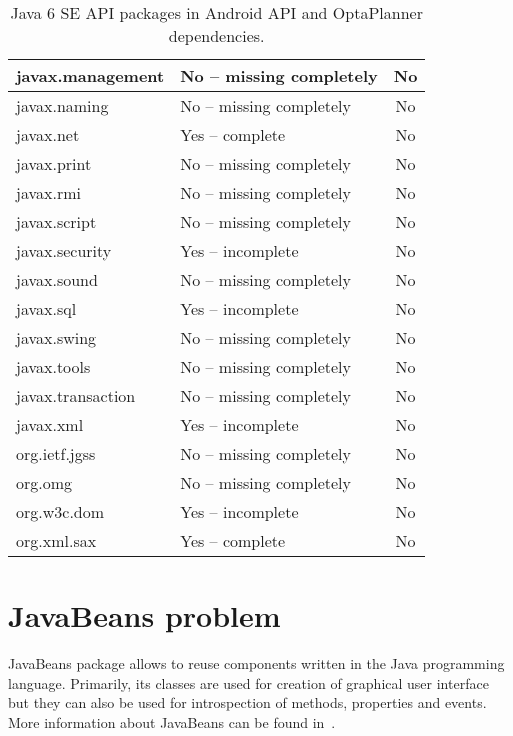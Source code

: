 \begin {table}[h!]
\begin{tabular}{|l|l|c|}
        javax.management      & No -- missing completely  & No  \\ \hline
        javax.naming          & No -- missing completely  & No  \\ \hline
        javax.net             & Yes -- complete           & No  \\ \hline
        javax.print           & No -- missing completely  & No  \\ \hline
        javax.rmi             & No -- missing completely  & No  \\ \hline
        javax.script          & No -- missing completely  & No  \\ \hline
        javax.security        & Yes -- incomplete         & No  \\ \hline
        javax.sound           & No -- missing completely  & No  \\ \hline
        javax.sql             & Yes -- incomplete         & No  \\ \hline
        javax.swing           & No -- missing completely  & No  \\ \hline
        javax.tools           & No -- missing completely  & No  \\ \hline
        javax.transaction     & No -- missing completely  & No  \\ \hline
        javax.xml             & Yes -- incomplete         & No  \\ \hline
        org.ietf.jgss         & No -- missing completely  & No  \\ \hline
        org.omg               & No -- missing completely  & No  \\ \hline
        org.w3c.dom           & Yes -- incomplete         & No  \\ \hline
        org.xml.sax           & Yes -- complete           & No  \\ \hline
    \end{tabular}
    \centering
    \caption{Java 6 SE API packages in Android API and OptaPlanner dependencies.}
    \label{ApiDiffTable}
\end{table}

\section{JavaBeans problem}\label{JavaBeansProblemSection}
JavaBeans package allows to reuse components written in the Java programming language. Primarily, its classes are used
for creation of graphical user interface but they can also be used for introspection of methods, properties and events.
More information about JavaBeans can be found in~\cite{Beans}.

